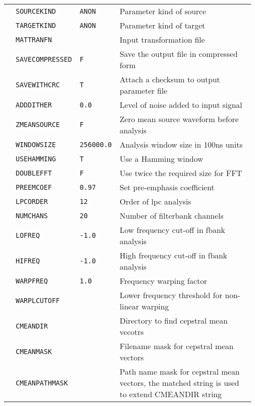 \begin{center}
\begin{supertabular}{|p{1.4cm}|l|l|p{6.6cm}|}
  & \texttt{SOURCEKIND} & \texttt{ANON} & Parameter kind of source \\ 
  & \texttt{TARGETKIND} & \texttt{ANON} & Parameter kind of target \\ 
  & \texttt{MATTRANFN } &  & Input transformation file  \\ 
  & \texttt{SAVECOMPRESSED} & \texttt{F} & Save the output file in compressed form \\ 
  & \texttt{SAVEWITHCRC} & \texttt{T} & Attach a checksum to output parameter file \\ 
  & \texttt{ADDDITHER} & \texttt{0.0} & Level of noise added to input signal \\  
  & \texttt{ZMEANSOURCE} & \texttt{F} & Zero mean source waveform before analysis \\ 
  & \texttt{WINDOWSIZE} & \texttt{256000.0} & Analysis window size in 100ns units \\ 
  & \texttt{USEHAMMING} & \texttt{T} & Use a Hamming window \\ 
  & \texttt{DOUBLEFFT} & \texttt{F} & Use twice the required size for FFT \\ 
  & \texttt{PREEMCOEF} & \texttt{0.97} & Set pre-emphasis coefficient \\ 
  & \texttt{LPCORDER} &  \texttt{12} &  Order of lpc analysis \\ 
  & \texttt{NUMCHANS} & \texttt{20} & Number of filterbank channels \\ 
  & \texttt{LOFREQ} & \texttt{-1.0} & Low frequency cut-off in fbank analysis \\ 
  & \texttt{HIFREQ}  & \texttt{-1.0} & High frequency cut-off in fbank analysis \\  
  & \texttt{WARPFREQ} & \texttt{1.0} & Frequency warping factor \\ 
  & \texttt{WARPLCUTOFF} &  & Lower frequency threshold for non-linear warping  \\ 
  & \texttt{CMEANDIR} &  & Directory to find cepstral mean vecotrs  \\ 
  & \texttt{CMEANMASK} &  & Filename mask for cepstral mean vectors  \\ 
  & \texttt{CMEANPATHMASK} &  & Path name mask for cepstral mean vectors, the matched string is used to extend CMEANDIR string \\ 

\end{supertabular}
\end{center}
